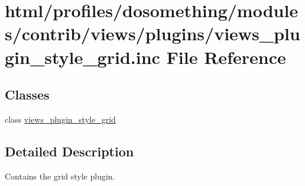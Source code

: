 \hypertarget{views__plugin__style__grid_8inc}{
\section{html/profiles/dosomething/modules/contrib/views/plugins/views\_\-plugin\_\-style\_\-grid.inc File Reference}
\label{views__plugin__style__grid_8inc}
}
\subsection*{Classes}
\begin{DoxyCompactItemize}
\item 
class \hyperlink{classviews__plugin__style__grid}{views\_\-plugin\_\-style\_\-grid}
\end{DoxyCompactItemize}


\subsection{Detailed Description}
Contains the grid style plugin. 